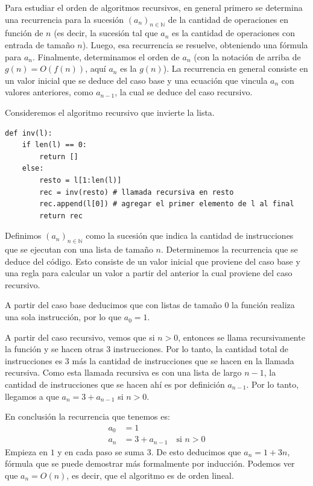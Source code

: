 \documentclass[a4paper, 12pt]{report}
\newcommand{\N}{\mathbb{N}}
\newcommand{\te}{\text}
\theoremstyle{definition}
\begin{document}
Para estudiar el orden de algoritmos recursivos, en general primero se determina una recurrencia para la sucesión $(a_n)_{n\in\N}$ de la cantidad de operaciones en función de $n$ (es decir, la sucesión tal que $a_n$ es la cantidad de operaciones con entrada de tamaño $n$). Luego, esa recurrencia se resuelve, obteniendo una fórmula para $a_n$. Finalmente, determinamos el orden de $a_n$ (con la notación de arriba de $g(n)=O(f(n))$, aquí $a_n$ es la $g(n)$). La recurrencia en general consiste en un valor inicial que se deduce del caso base y una ecuación que vincula $a_n$ con valores anteriores, como $a_{n-1}$, la cual se deduce del caso recursivo.

Consideremos el algoritmo recursivo que invierte la lista.
\begin{verbatim}
def inv(l):
    if len(l) == 0:
        return []
    else:
        resto = l[1:len(l)]
        rec = inv(resto) # llamada recursiva en resto
        rec.append(l[0]) # agregar el primer elemento de l al final
        return rec
\end{verbatim}
Definimos $(a_n)_{n\in \N}$ como la sucesión que indica la cantidad de instrucciones que se ejecutan con una lista de tamaño $n$. Determinemos la recurrencia que se deduce del código. Esto consiste de un valor inicial que proviene del caso base y una regla para calcular un valor a partir del anterior la cual proviene del caso recursivo.

A partir del caso base deducimos que con listas de tamaño $0$ la función realiza una sola instrucción, por lo que $a_0=1$.

A partir del caso recursivo, vemos que si $n>0$, entonces se llama recursivamente la función y se hacen otras 3 instrucciones. Por lo tanto, la cantidad total de instrucciones es 3 más la cantidad de instrucciones que se hacen en la llamada recursiva. Como esta llamada recursiva es con una lista de largo $n-1$, la cantidad de instrucciones que se hacen ahí es por definición $a_{n-1}$. Por lo tanto, llegamos a que $a_n = 3 + a_{n-1}$ si $n>0$.

En conclusión la recurrencia que tenemos es:
\begin{align*}
	a_0 &= 1\\
	a_n &= 3 + a_{n-1}\quad \te{si $n>0$}
\end{align*}
Empieza en $1$ y en cada paso se suma $3$. De esto deducimos que $a_n=1+3n$, fórmula que se puede demostrar más formalmente por inducción. Podemos ver que $a_n=O(n)$, es decir, que el algoritmo es de orden lineal.
\end{document}
